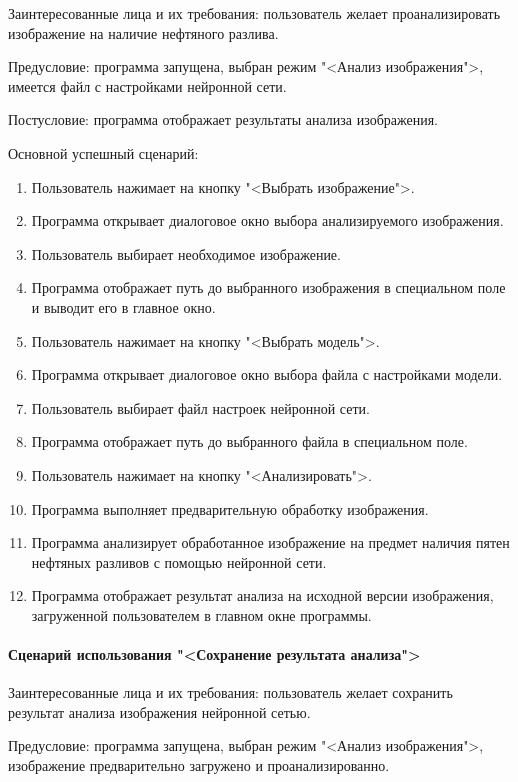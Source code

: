 Заинтересованные лица и их требования: пользователь желает проанализировать изображение на наличие нефтяного разлива.

Предусловие: программа запущена, выбран режим "<Анализ изображения">, имеется файл с настройками нейронной сети.

Постусловие: программа отображает результаты анализа изображения.

Основной успешный сценарий:

\begin{enumerate}
	\item Пользователь нажимает на кнопку "<Выбрать изображение">.
	\item Программа открывает диалоговое окно выбора анализируемого изображения.
	\item Пользователь выбирает необходимое изображение.
	\item Программа отображает путь до выбранного изображения в специальном поле и выводит его в главное окно.
	\item Пользователь нажимает на кнопку "<Выбрать модель">.
	\item Программа открывает диалоговое окно выбора файла с настройками модели.
	\item Пользователь выбирает файл настроек нейронной сети.
	\item Программа отображает путь до выбранного файла в специальном поле.
	\item Пользователь нажимает на кнопку "<Анализировать">.
	\item Программа выполняет предварительную обработку изображения.
	\item Программа анализирует обработанное изображение на предмет наличия пятен нефтяных разливов с помощью нейронной сети.
	\item Программа отображает результат анализа на исходной версии изображения, загруженной пользователем в главном окне программы.
\end{enumerate}

\paragraph{Сценарий использования "<Сохранение результата анализа">}

Заинтересованные лица и их требования: пользователь желает сохранить результат анализа изображения нейронной сетью.

Предусловие: программа запущена, выбран режим "<Анализ изображения">, изображение предварительно загружено и проанализированно.

